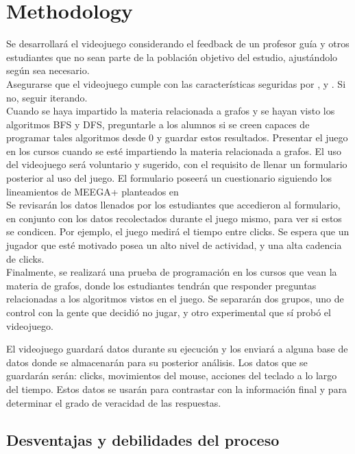 \documentclass[submission]{eptcs}
\begin{document}
\section{Methodology}


Se desarrollará el videojuego considerando el feedback de un profesor guía y otros estudiantes
que no sean parte de la población objetivo del estudio, ajustándolo según sea necesario. \\
Asegurarse que el videojuego cumple con las características seguridas por \cite{evaluation_of_games_for_teaching_cs},
\cite{petri2018method} y \cite{using_videogames_maths}. Si no, seguir iterando. \\
Cuando se haya impartido la materia relacionada a grafos y se hayan visto los algoritmos BFS y DFS, preguntarle a
los alumnos si se creen capaces de programar tales algoritmos desde 0 y guardar estos resultados.
Presentar el juego en los cursos cuando se esté impartiendo la materia relacionada a grafos. El uso del
videojuego será voluntario y sugerido, con el requisito de llenar un formulario posterior al uso del juego.
El formulario poseerá un cuestionario siguiendo los lineamientos de MEEGA+ planteados en \cite{petri2018meegaplus} \\
Se revisarán los datos llenados por los estudiantes que accedieron al formulario, en conjunto con los
datos recolectados durante el juego mismo, para ver si estos se condicen. Por ejemplo, el juego medirá el tiempo
entre clicks. Se espera que un jugador que esté motivado posea un alto nivel de actividad, y una alta cadencia de clicks. \\
Finalmente, se realizará una prueba de programación en los cursos que vean la materia de grafos, donde los estudiantes
tendrán que responder preguntas relacionadas a los algoritmos vistos en el juego. Se separarán dos grupos, 
uno de control con la gente que decidió no jugar, y otro experimental que sí probó el videojuego.

El videojuego guardará datos durante su ejecución y los enviará a alguna base de datos donde se almacenarán para su posterior
análisis. Los datos que se guardarán serán: clicks, movimientos del mouse, acciones del teclado a lo largo del tiempo.
Estos datos se usarán para contrastar con la información final y para determinar el grado de veracidad de las respuestas.


\subsection{Desventajas y debilidades del proceso}
\end{document}
